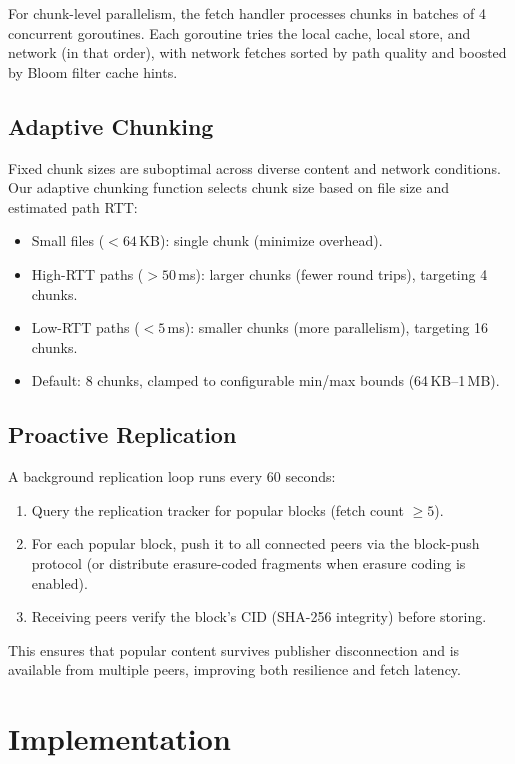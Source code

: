 \documentclass[sigconf,nonacm]{acmart}
\begin{document}
For chunk-level parallelism, the fetch handler processes chunks in batches of 4 concurrent goroutines. Each goroutine tries the local cache, local store, and network (in that order), with network fetches sorted by path quality and boosted by Bloom filter cache hints.

\subsection{Adaptive Chunking}

Fixed chunk sizes are suboptimal across diverse content and network conditions. Our adaptive chunking function selects chunk size based on file size and estimated path RTT:
\begin{itemize}
\item Small files ($< 64$\,KB): single chunk (minimize overhead).
\item High-RTT paths ($> 50$\,ms): larger chunks (fewer round trips), targeting 4 chunks.
\item Low-RTT paths ($< 5$\,ms): smaller chunks (more parallelism), targeting 16 chunks.
\item Default: 8 chunks, clamped to configurable min/max bounds (64\,KB--1\,MB).
\end{itemize}

\subsection{Proactive Replication}

A background replication loop runs every 60 seconds:
\begin{enumerate}
\item Query the replication tracker for popular blocks (fetch count $\geq 5$).
\item For each popular block, push it to all connected peers via the block-push protocol (or distribute erasure-coded fragments when erasure coding is enabled).
\item Receiving peers verify the block's CID (SHA-256 integrity) before storing.
\end{enumerate}

This ensures that popular content survives publisher disconnection and is available from multiple peers, improving both resilience and fetch latency.

\section{Implementation}
\label{sec:implementation}
\end{document}
